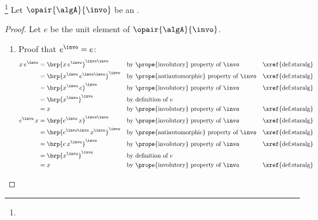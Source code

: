 \begin{proposition}
\footnote{
  }
\label{prop:nalg_x*-1}
Let $\opair{\algA}{\invo}$ be an .
\end{proposition}
\begin{proof}
Let $e$ be the unit element of $\opair{\algA}{\invo}$.
\begin{enumerate}
  \item Proof that $e^\invo = e$:\label{item:nalg_x*-1_e}
    \begin{align*}
      x\,e^\invo 
        &= \brp{x\,e^\invo}^{\invo\invo}
        && \text{by \prope{involutory} property of $\invo$}
        && \text{\xref{def:staralg}}
      \\&= \brp{x^\invo\,e^{\invo\invo}}^{\invo}
        && \text{by \prope{antiautomorphic} property of $\invo$}
        && \text{\xref{def:staralg}}
      \\&= \brp{x^\invo\,e}^{\invo}
        && \text{by \prope{involutory} property of $\invo$}
        && \text{\xref{def:staralg}}
      \\&= \brp{x^\invo}^{\invo}
        && \text{by definition of $e$}
      \\&= x
        && \text{by \prope{involutory} property of $\invo$}
        && \text{\xref{def:staralg}}
      \\
      e^\invo\,x 
        &= \brp{e^\invo\,x}^{\invo\invo}
        && \text{by \prope{involutory} property of $\invo$}
        && \text{\xref{def:staralg}}
      \\&= \brp{e^{\invo\invo}\,x^\invo}^{\invo}
        && \text{by \prope{antiautomorphic} property of $\invo$}
        && \text{\xref{def:staralg}}
      \\&= \brp{e\,x^\invo}^{\invo}
        && \text{by \prope{involutory} property of $\invo$}
        && \text{\xref{def:staralg}}
      \\&= \brp{x^\invo}^{\invo}
        && \text{by definition of $e$}
      \\&= x
        && \text{by \prope{involutory} property of $\invo$}
        && \text{\xref{def:staralg}}
    \end{align*}


\end{enumerate}
\end{proof}
